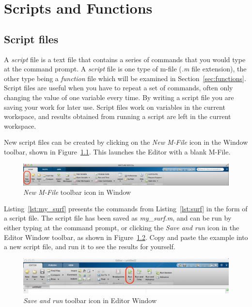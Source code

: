 \chapter{Scripts and Functions}

\section{Script files}
A \textit{script} file is a text file that contains a series of \mlab commands that you would type at the command prompt. A \textit{script} file is one type of m-file (\textit{.m} file extension), the other type being a \textit{function} file which will be examined in Section~\ref{sec:functions}. Script files are useful when you have to repeat a set of commands, often only changing the value of one variable every time. By writing a script file you are saving your work for later use. Script files work on variables in the current workspace, and results obtained from running a script are left in the current workspace.

New script files can be created by clicking on the \textit{New M-File} icon in the \mlab Window toolbar, shown in Figure~\ref{fig:new_script}. This launches the \mlab Editor with a blank M-File.
\begin{figure}[h]
	\myfloatalign
	\includegraphics[width=0.9\linewidth]{Graphics/Unit03/new_script}
	\caption{\textit{New M-File} toolbar icon in \mlab Window}
	\label{fig:new_script}
\end{figure}

Listing~\ref{lst:my_surf} presents the commands from Listing~\ref{lst:surf} in the form of a script file. The script file has been saved as \textit{my\_surf.m}, and can be run by either typing  at the command prompt, or clicking the \textit{Save and run} icon in the Editor Window toolbar, as shown in Figure~\ref{fig:run_script}. Copy and paste the example into a new script file, and run it to see the results for yourself.
\begin{figure}[h]
	\myfloatalign
	\includegraphics[width=0.9\linewidth]{Graphics/Unit03/run_script}
	\caption{\textit{Save and run} toolbar icon in Editor Window}
	\label{fig:run_script}
\end{figure}

